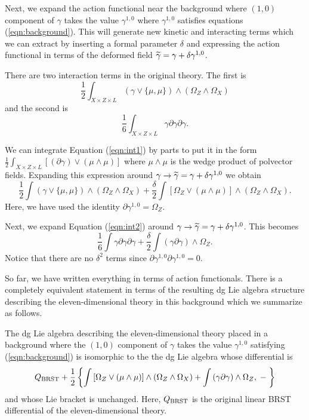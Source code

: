 \documentclass[11pt]{amsart}
\begin{document}
Next, we expand the action functional near the background where $(1,0)$ component of $\gamma$ takes the value $\gamma^{1,0}$ where $\gamma^{1,0}$ satisfies equations (\ref{eqn:background}).
This will generate new kinetic and interacting terms which we can extract by inserting a formal parameter $\delta$ and expressing the action functional in terms of the deformed field $\Tilde{\gamma} = \gamma + \delta \gamma^{1,0}$.

There are two interaction terms in the original theory.
The first is
\begin{equation}\label{eqn:int1}
  \frac12 \int_{X\times Z \times L} \left(\gamma \vee \{\mu, \mu\} \right) \wedge (\Omega_Z \wedge \Omega_X)
\end{equation}
and the second is
\begin{equation} \label{eqn:int2}
  \frac16\int_{X \times Z \times L} \gamma \partial \gamma \partial \gamma .
\end{equation}

We can integrate Equation (\ref{eqn:int1}) by parts to put it in the form $\frac12 \int_{X \times Z \times L} \left[(\partial \gamma) \vee (\mu \wedge \mu) \right]$ where $\mu \wedge \mu$ is the wedge product of polvector fields.
Expanding this expression around $\gamma \to \Tilde{\gamma} = \gamma + \delta \gamma^{1,0}$ we obtain
\[
  \frac12 \int \left(\gamma \vee \{\mu, \mu\} \right) \wedge (\Omega_Z \wedge \Omega_X) + \frac{\delta}{2} \int \left[\Omega_Z \vee (\mu \wedge \mu) \right] \wedge (\Omega_Z \wedge \Omega_X) .
\]
Here, we have used the identity $\partial \gamma^{1,0} = \Omega_Z$.

Next, we expand Equation (\ref{eqn:int2}) around $\gamma \to \Tilde{\gamma} = \gamma + \delta \gamma^{1,0}$.
This becomes
\[
  \frac16 \int \gamma \partial \gamma \partial \gamma + \frac{\delta}{2} \int \left(\gamma \partial \gamma\right) \wedge \Omega_Z .
\]
Notice that there are no $\delta^2$ terms since $\partial \gamma^{1,0} \partial \gamma^{1,0} = 0$.

So far, we have written everything in terms of action functionals.
There is a completely equivalent statement in terms of the resulting dg Lie algebra structure describing the eleven-dimensional theory in this background which we summarize as follows.

\begin{lem} \label{lem:background}
  The dg Lie algebra describing the eleven-dimensional theory placed in a background where the $(1,0)$ component of $\gamma$ takes the value $\gamma^{1,0}$ satisfying (\ref{eqn:background}) is isomorphic to the the dg Lie algebra whose differential is
  \begin{equation}\label{eqn:newdiff}
    Q_{\rm BRST} + \frac{1}{2} \left\{ \int \left[\Omega_Z \vee (\mu \wedge \mu) \right] \wedge (\Omega_Z \wedge \Omega_X) + \int \left(\gamma \partial \gamma\right) \wedge \Omega_Z , \; - \; \right\}
  \end{equation}
  and whose Lie bracket is unchanged.
  Here, $Q_{\rm BRST}$ is the original linear BRST differential of the eleven-dimensional theory.
\end{lem}
\end{document}
